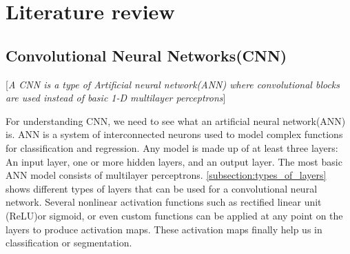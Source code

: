 \chapter{Literature review}\label{chapt:lit}
\section{Convolutional Neural Networks(CNN)}
[\textit{A CNN is a type of Artificial neural network(ANN) where convolutional blocks are used instead of basic 1-D multilayer perceptrons}]

For understanding CNN, we need to see what an artificial neural network(ANN) is. ANN is a system of interconnected neurons used to model complex functions for classification and regression. Any model is made up of at least three layers: An input layer, one or more hidden layers, and an output layer. The most basic ANN model consists of multilayer perceptrons. \ref{subsection:types_of_layers} shows different types of layers that can be used for a convolutional neural network. Several nonlinear activation functions such as rectified linear unit (ReLU)or sigmoid, or even custom functions can be applied at any point on the layers to produce activation maps. These activation maps finally help us in classification or segmentation.

